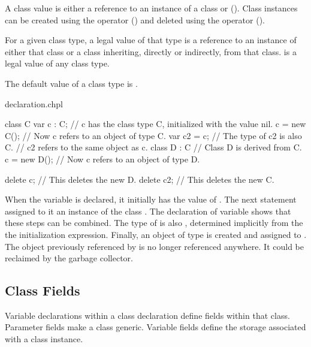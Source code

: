 A class value is either a reference to an instance of a class
or  (). Class instances can be created
using the  operator () and deleted using
the  operator ().

For a given class type, a legal value of that type is a reference to
an instance of either that class or a class inheriting, directly or
indirectly, from that class.
 is a legal value of any class type.

The default value of a class type is .

\begin{chapelexample}{declaration.chpl}
\begin{chapel}
class C { }
var c : C;      // c has the class type C, initialized with the value nil.
c = new C();    // Now c refers to an object of type C.
var c2 = c;     // The type of c2 is also C.
                // c2 refers to the same object as c.
class D : C {}  // Class D is derived from C.
c = new D();    // Now c refers to an object of type D.
\end{chapel}
\begin{chapelpost}
delete c;   // This deletes the new D.
delete c2;  // This deletes the new C.
\end{chapelpost}
\begin{chapeloutput}
\end{chapeloutput}
When the variable  is declared, it initially has the value
of .  The next statement assigned to it an instance of the
class .  The declaration of variable  shows that these steps can
be combined.  The type of  is also , determined implicitly from
the the initialization expression.  Finally, an object of type  is created and
assigned to .  The object previously referenced by  is no longer
referenced anywhere. It could be reclaimed by the garbage collector.
\end{chapelexample}

\subsection{Class Fields}
\label{Class_Fields}

Variable declarations within a class declaration define
fields within that class.  Parameter fields make a class generic.
Variable fields define the storage associated with a class instance.

